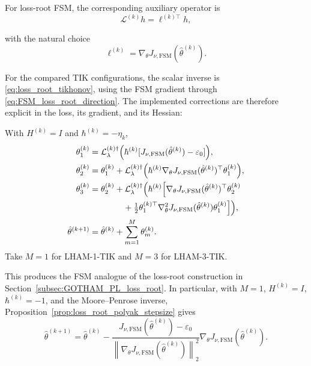 \documentclass[11pt]{article}
\newenvironment{updaterule}[2]{%
  \begin{tcolorbox}[
    colback=#1!6!white, colframe=#1!65!black,
    colbacktitle=#1!12!white, coltitle=#1!45!black,
    title={#2}, halign title=right,
    fonttitle=\normalfont\sffamily\bfseries\small,
    boxrule=.5pt, arc=0pt, outer arc=0pt,
    left=2mm, right=2mm, top=0mm, bottom=0mm,
    toptitle=1mm, bottomtitle=1mm,
    before skip=8pt, after skip=8pt]
}{\end{tcolorbox}}
\theoremstyle{remark}
\begin{document}
For loss-root FSM, the corresponding auxiliary operator is
\begin{equation}
\label{eq:FSM_loss_root_aux_operator}
    \mathcal{L}^{(k)}h
    =
    \ell^{(k)\top}h,
\end{equation}

with the natural choice
\begin{equation}
\label{eq:FSM_loss_root_direction}
    \ell^{(k)}
    =
    \nabla_{\theta}J_{\nu,\mathrm{FSM}}
    \left(
    \hat{\theta}^{(k)}
    \right).
\end{equation}


For the compared TIK configurations, the scalar inverse is
\eqref{eq:loss_root_tikhonov}, using the FSM gradient through
\eqref{eq:FSM_loss_root_direction}. The implemented corrections are
therefore explicit in the loss, its gradient, and its Hessian:
\begin{updaterule}{RuleLoss}{LHAM-1-TIK / LHAM-3-TIK (FSM)}
With $H^{(k)}=I$ and $\hbar^{(k)}=-\eta_k$,
\begin{equation}
\label{eq:FSM_TIK_implemented_updates}
\begin{aligned}
    \theta_1^{(k)}
      &=\mathcal L^{(k)\dagger}_{\lambda}
        \Bigl(\hbar^{(k)}
        [J_{\nu,\mathrm{FSM}}(\hat\theta^{(k)})-\varepsilon_0]\Bigr),\\
    \theta_2^{(k)}
      &=\theta_1^{(k)}+\mathcal L^{(k)\dagger}_{\lambda}
        \Bigl(\hbar^{(k)}
          \nabla_\theta J_{\nu,\mathrm{FSM}}(\hat\theta^{(k)})^\top
          \theta_1^{(k)}\Bigr),\\
    \theta_3^{(k)}
      &=\theta_2^{(k)}+\mathcal L^{(k)\dagger}_{\lambda}
        \Bigl(\hbar^{(k)}\Bigl[
          \nabla_\theta J_{\nu,\mathrm{FSM}}(\hat\theta^{(k)})^\top
          \theta_2^{(k)}\\
      &\qquad\qquad+\tfrac12\theta_1^{(k)\top}
          \nabla_\theta^2J_{\nu,\mathrm{FSM}}(\hat\theta^{(k)})
          \theta_1^{(k)}\Bigr]\Bigr),\\
    \hat\theta^{(k+1)}
      &=\hat\theta^{(k)}+\sum_{m=1}^{M}\theta_m^{(k)}.
\end{aligned}
\end{equation}
Take $M=1$ for LHAM-1-TIK and $M=3$ for LHAM-3-TIK.
\end{updaterule}

This produces the FSM analogue of the loss-root construction in
Section~\ref{subsec:GOTHAM_PL_loss_root}. In particular, with $M=1$,
$H^{(k)}=I$, $\hbar^{(k)}=-1$, and the Moore--Penrose inverse,
Proposition~\ref{prop:loss_root_polyak_stepsize} gives
\begin{equation}
\label{eq:FSM_loss_root_polyak_update}
    \hat{\theta}^{(k+1)}
    =
    \hat{\theta}^{(k)}
    -
    \frac{
    J_{\nu,\mathrm{FSM}}(\hat{\theta}^{(k)})-\varepsilon_0
    }{
    \left\|
    \nabla_{\theta}J_{\nu,\mathrm{FSM}}(\hat{\theta}^{(k)})
    \right\|_2^2
    }
    \nabla_{\theta}J_{\nu,\mathrm{FSM}}(\hat{\theta}^{(k)}).
\end{equation}
\end{document}
